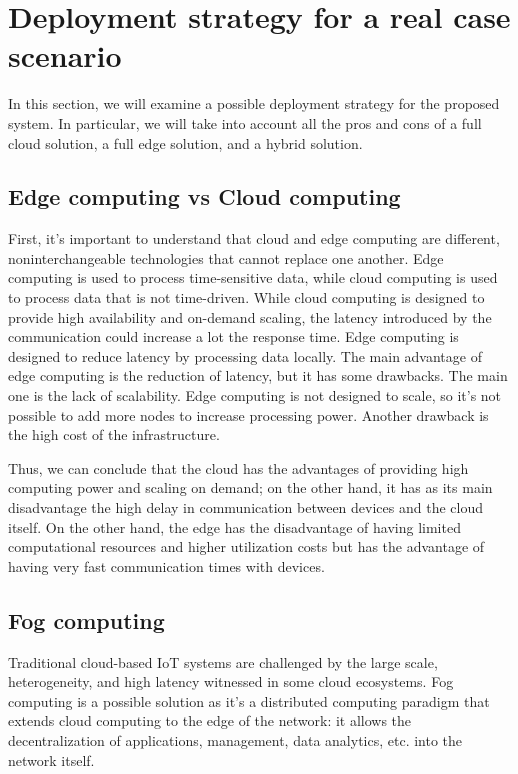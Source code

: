\section{Deployment strategy for a real case scenario}
In this section, we will examine a possible deployment strategy for the proposed system. In particular, we will take into account all the pros and
cons of a full cloud solution, a full edge solution, and a hybrid solution.

\subsection{Edge computing vs Cloud computing}
First, it's important to understand that cloud and edge computing are different, noninterchangeable technologies that cannot replace one another.
Edge computing is used to process time-sensitive data, while cloud computing is used to process data that is not time-driven. While cloud computing
is designed to provide high availability and on-demand scaling, the latency introduced by the communication could increase a lot the response time.
Edge computing is designed to reduce latency by processing data locally. The main advantage of edge computing is the reduction of latency, but it has
some drawbacks. The main one is the lack of scalability. Edge computing is not designed to scale, so it's not possible to add more nodes to increase
processing power. Another drawback is the high cost of the infrastructure.

Thus, we can conclude that the cloud has the advantages of providing high computing power and scaling on demand; on the other hand, it has as its
main disadvantage the high delay in communication between devices and the cloud itself. On the other hand, the edge has the disadvantage of having
limited computational resources and higher utilization costs but has the advantage of having very fast communication times with devices.

\subsection{Fog computing}
Traditional cloud-based IoT systems are challenged by the large scale, heterogeneity, and high latency witnessed in some cloud ecosystems. 
Fog computing is a possible solution as it's a distributed computing paradigm that extends cloud computing to the edge of the network:
it allows the decentralization of applications, management, data analytics, etc. into the network itself.

